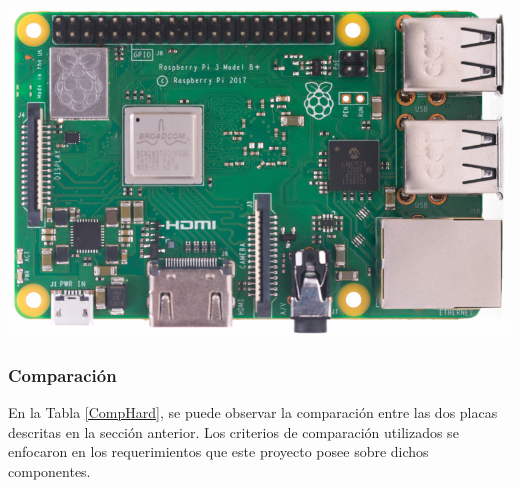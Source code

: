             \begin{minipage}{0.95\textwidth}
            
            \begin{center}
                \includegraphics[scale=0.30]{hardware/raspberrypib3.jpg}
                
                \label{boardRaspberry}
            \end{center}
            \end{minipage}
            \begin{minipage}{0.95\textwidth}
            \subsubsection{Comparación}
                \par En la Tabla \ref{CompHard}, se puede observar la comparación entre las dos placas descritas en la sección anterior. Los criterios de comparación utilizados se enfocaron en los requerimientos que este proyecto posee sobre dichos componentes.
            \end{minipage}
        
